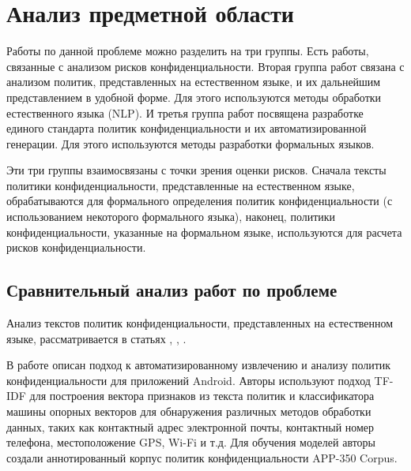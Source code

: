 \documentclass[../main]{subfiles}
\begin{document}
\newpage
\section{Анализ предметной области}

Работы по данной проблеме можно разделить на три группы. Есть работы, связанные с анализом рисков конфиденциальности. Вторая группа работ связана с анализом политик, представленных на естественном языке, и их дальнейшим представлением в удобной форме. Для этого используются методы обработки естественного языка (NLP). И третья группа работ посвящена разработке единого стандарта политик конфиденциальности и их автоматизированной генерации. Для этого используются методы разработки формальных языков.

Эти три группы взаимосвязаны с точки зрения оценки рисков. Сначала тексты политики конфиденциальности, представленные на естественном языке, обрабатываются для формального определения политик конфиденциальности (с использованием некоторого формального языка), наконец, политики конфиденциальности, указанные на формальном языке, используются для расчета рисков конфиденциальности.

\subsection{Сравнительный анализ работ по проблеме}
Анализ текстов политик конфиденциальности, представленных на естественном языке, рассматривается в статьях \cite{MDPI5}, \cite{MDPI6}, \cite{MDPI9}.

В работе \cite{MDPI5} описан подход к автоматизированному извлечению и анализу политик конфиденциальности для приложений Android. Авторы используют подход TF-IDF для построения вектора признаков из текста политик и классификатора машины опорных векторов для обнаружения различных методов обработки данных, таких как контактный адрес электронной почты, контактный номер телефона, местоположение GPS, Wi-Fi и т.д. Для обучения моделей авторы создали аннотированный корпус политик конфиденциальности APP-350 Corpus.
\end{document}
